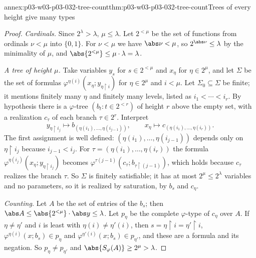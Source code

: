 \begin{annexitem}{annex:p03-w03-p03-032-tree-count}{thm:p03-w03-p03-032-tree-count}{Trees of every height give many types}
\begin{proof}
\emph{Cardinals.}  Since \(2^\lambda>\lambda\), \(\mu\leq\lambda\).  Let
\(2^{<\mu}\) be the set of functions from ordinals \(\nu<\mu\) into
\(\{0,1\}\).  For \(\nu<\mu\) we have \(\abs\nu<\mu\), so
\(2^{\abs\nu}\leq\lambda\) by the minimality of \(\mu\), and
\(\abs{2^{<\mu}}\leq\mu\cdot\lambda=\lambda\).

\emph{A tree of height \(\mu\).}  Take variables \(y_s\) for
\(s\in2^{<\mu}\) and \(x_\eta\) for \(\eta\in2^\mu\), and let \(\Sigma\) be
the set of formulas
\(\varphi^{\eta(i)}(x_\eta;y_{\eta\mathbin{\upharpoonright}i})\) for
\(\eta\in2^\mu\) and \(i<\mu\).  Let \(\Sigma_0\subseteq\Sigma\) be finite;
it mentions finitely many \(\eta\) and finitely many levels, listed as
\(i_1<\cdots<i_r\).  By hypothesis there is a \(\varphi\)-tree
\((b_t:t\in2^{<r})\) of height \(r\) above the empty set, with a realization
\(c_\tau\) of each branch \(\tau\in2^r\).  Interpret
\[
  y_{\eta\mathbin{\upharpoonright}i_j}\mapsto
  b_{(\eta(i_1),\ldots,\eta(i_{j-1}))},
  \qquad
  x_\eta\mapsto c_{(\eta(i_1),\ldots,\eta(i_r))}.
\]
The first assignment is well defined: \((\eta(i_1),\ldots,\eta(i_{j-1}))\)
depends only on \(\eta\mathbin{\upharpoonright}i_j\) because
\(i_{j-1}<i_j\).  For \(\tau=(\eta(i_1),\ldots,\eta(i_r))\) the formula
\(\varphi^{\eta(i_j)}(x_\eta;y_{\eta\mathbin{\upharpoonright}i_j})\) becomes
\(\varphi^{\tau(j-1)}(c_\tau;b_{\tau\mathbin{\upharpoonright}(j-1)})\), which
holds because \(c_\tau\) realizes the branch \(\tau\).  So \(\Sigma\) is
finitely satisfiable; it has at most \(2^\mu\leq2^\lambda\) variables and no
parameters, so it is realized by saturation, by \(b_s\) and \(c_\eta\).

\emph{Counting.}  Let \(A\) be the set of entries of the \(b_s\); then
\(\abs A\leq\abs{2^{<\mu}}\cdot\abs y\leq\lambda\).  Let \(p_\eta\) be the
complete \(\varphi\)-type of \(c_\eta\) over \(A\).  If \(\eta\neq\eta'\) and
\(i\) is least with \(\eta(i)\neq\eta'(i)\), then
\(s=\eta\mathbin{\upharpoonright}i=\eta'\mathbin{\upharpoonright}i\),
\(\varphi^{\eta(i)}(x;b_s)\in p_\eta\) and
\(\varphi^{\eta'(i)}(x;b_s)\in p_{\eta'}\), and these are a formula and its
negation.  So \(p_\eta\neq p_{\eta'}\) and
\(\abs{S_\varphi(A)}\geq2^\mu>\lambda\).
\end{proof}
\end{annexitem}

